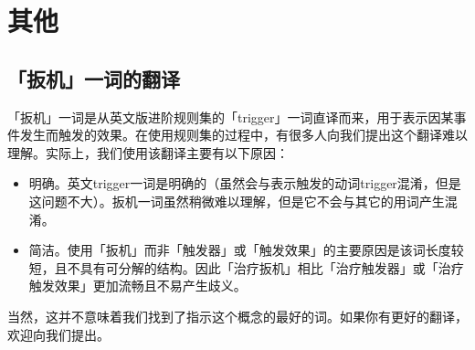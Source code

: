 \chapter{其他}

\section{「扳机」一词的翻译}

「扳机」一词是从英文版进阶规则集的「trigger」一词直译而来，用于表示因某事件发生而触发的效果。在使用规则集的过程中，有很多人向我们提出这个翻译难以理解。实际上，我们使用该翻译主要有以下原因：
\begin{itemize}
    \item 明确。英文trigger一词是明确的（虽然会与表示触发的动词trigger混淆，但是这问题不大）。扳机一词虽然稍微难以理解，但是它不会与其它的用词产生混淆。
    \item 简洁。使用「扳机」而非「触发器」或「触发效果」的主要原因是该词长度较短，且不具有可分解的结构。因此「治疗扳机」相比「治疗触发器」或「治疗触发效果」更加流畅且不易产生歧义。
\end{itemize}
当然，这并不意味着我们找到了指示这个概念的最好的词。如果你有更好的翻译，欢迎向我们提出。